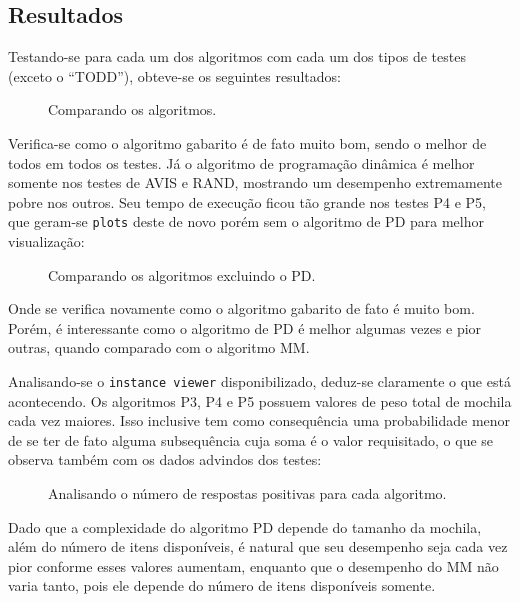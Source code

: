 \documentclass{article}[twocolumn]
\begin{document}
	\subsection{Resultados}
	Testando-se para cada um dos algoritmos com cada um dos tipos de testes (exceto o
	``TODD''), obteve-se os seguintes resultados:
	\begin{figure}[H]
		\centering
		\caption{Comparando os algoritmos.}
	\end{figure}
	Verifica-se como o algoritmo gabarito \'e de fato muito bom, sendo o melhor
	de todos em todos os testes. J\'a o algoritmo de programa\c{c}\~ao din\^amica \'e
	melhor somente nos testes de AVIS e RAND, mostrando um desempenho extremamente pobre
	nos outros. Seu tempo de execu\c{c}\~ao ficou t\~ao grande nos testes P4 e P5, que geram-se
	\texttt{plots} deste de novo por\'em sem o algoritmo de PD para melhor visualiza\c{c}\~ao:
	\begin{figure}[H]
		\centering
		\caption{Comparando os algoritmos excluindo o PD.}
	\end{figure}
	Onde se verifica novamente como o algoritmo gabarito de fato \'e muito bom. Por\'em, \'e
	interessante como o algoritmo de PD \'e melhor algumas vezes e pior outras, quando comparado
	com o algoritmo MM.
	
	Analisando-se o \texttt{instance viewer} disponibilizado, deduz-se
	claramente o que est\'a acontecendo. Os algoritmos P3, P4 e P5 possuem valores de peso total
	de mochila cada vez maiores. Isso inclusive tem como consequ\^encia uma probabilidade
	menor de se ter de fato alguma subsequ\^encia cuja soma \'e o valor requisitado, o que
	se observa tamb\'em com os dados advindos dos testes:
	\begin{figure}[H]
		\centering
		\caption{Analisando o n\'umero de respostas positivas para cada algoritmo.}
	\end{figure}
	Dado que a complexidade do algoritmo PD depende do tamanho da mochila, al\'em do n\'umero
	de itens dispon\'iveis, \'e natural que seu desempenho seja cada vez pior conforme esses
	valores aumentam, enquanto que o desempenho do MM n\~ao varia tanto, pois ele depende
	do n\'umero de itens dispon\'iveis somente.
\end{document}
